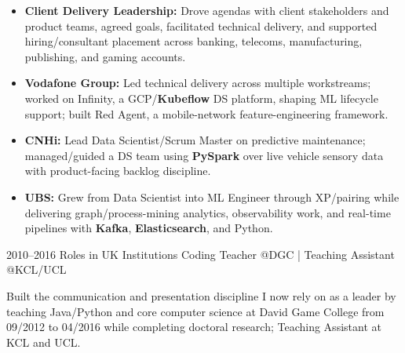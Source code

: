 \documentclass[]{../../../../friggeri-cv}
\begin{document}
\begin{entrylist}
{{        }
        \begin{itemize}[leftmargin=1.1em]
					            \item \footnotesize\textbf{Client Delivery Leadership:} Drove agendas with client stakeholders and product teams, agreed goals, facilitated technical delivery, and supported hiring/consultant placement across banking, telecoms, manufacturing, publishing, and gaming accounts.
					            \item \footnotesize\textbf{Vodafone Group:} Led technical delivery across multiple workstreams; worked on Infinity, a GCP/\textbf{Kubeflow} DS platform, shaping ML lifecycle support; built Red Agent, a mobile-network feature-engineering framework.
				            \item \footnotesize\textbf{CNHi:} Lead Data Scientist/Scrum Master on predictive maintenance; managed/guided a DS team using \textbf{PySpark} over live vehicle sensory data with product-facing backlog discipline.
			            \item \footnotesize\textbf{UBS:} Grew from Data Scientist into ML Engineer through XP/pairing while delivering graph/process-mining analytics, observability work, and real-time pipelines with \textbf{Kafka}, \textbf{Elasticsearch}, and Python.
	        \end{itemize}
    }
    \entry
    {2010–2016}
    {Roles in UK Institutions}
    {\small Coding Teacher @DGC | Teaching Assistant @KCL/UCL}
    {
        {\small
        \setlength{\parindent}{0pt}
        \setlength{\leftskip}{0pt}
	        Built the communication and presentation discipline I now rely on as a leader by teaching Java/Python and core computer science at David Game College from 09/2012 to 04/2016 while completing doctoral research; Teaching Assistant at KCL and UCL.

	        }
	    }
	\end{entrylist}
	\newpage
	\setlength{\parskip}{2pt}
	\setlength{\parsep}{0pt}
\end{document}
